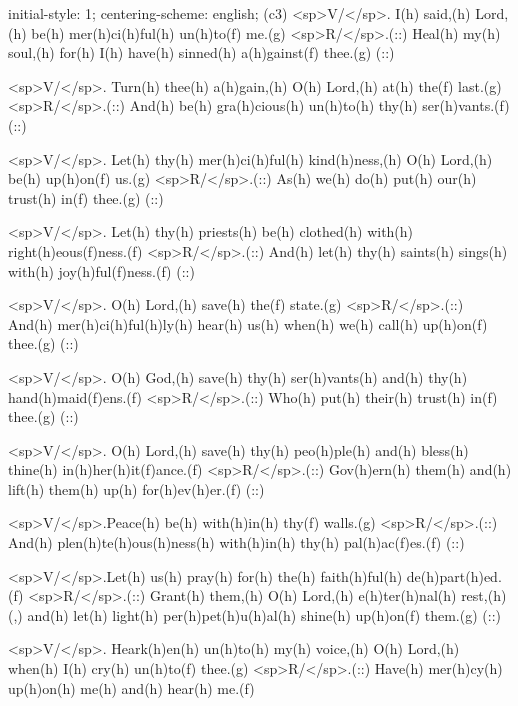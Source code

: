 initial-style: 1;
centering-scheme: english;
(c3) <sp>V/</sp>. I(h) said,(h) Lord,(h) be(h) mer(h)ci(h)ful(h) un(h)to(f) me.(g) <sp>R/</sp>.(::) Heal(h) my(h) soul,(h) for(h) I(h) have(h) sinned(h) a(h)gainst(f) thee.(g) (::)

<sp>V/</sp>. Turn(h) thee(h) a(h)gain,(h) O(h) Lord,(h) at(h) the(f) last.(g) <sp>R/</sp>.(::) And(h) be(h) gra(h)cious(h) un(h)to(h) thy(h) ser(h)vants.(f) (::)

<sp>V/</sp>. Let(h) thy(h) mer(h)ci(h)ful(h) kind(h)ness,(h) O(h) Lord,(h) be(h) up(h)on(f) us.(g) <sp>R/</sp>.(::) As(h) we(h) do(h) put(h) our(h) trust(h) in(f) thee.(g) (::)

<sp>V/</sp>. Let(h) thy(h) priests(h) be(h) clothed(h) with(h) right(h)eous(f)ness.(f) <sp>R/</sp>.(::) And(h) let(h) thy(h) saints(h) sings(h) with(h) joy(h)ful(f)ness.(f) (::)

<sp>V/</sp>. O(h) Lord,(h) save(h) the(f) state.(g) <sp>R/</sp>.(::) And(h) mer(h)ci(h)ful(h)ly(h) hear(h) us(h) when(h) we(h) call(h) up(h)on(f) thee.(g) (::)

<sp>V/</sp>. O(h) God,(h) save(h) thy(h) ser(h)vants(h) and(h) thy(h) hand(h)maid(f)ens.(f) <sp>R/</sp>.(::) Who(h) put(h) their(h) trust(h) in(f) thee.(g) (::)

<sp>V/</sp>. O(h) Lord,(h) save(h) thy(h) peo(h)ple(h) and(h) bless(h) thine(h) in(h)her(h)it(f)ance.(f) <sp>R/</sp>.(::) Gov(h)ern(h) them(h) and(h) lift(h) them(h) up(h) for(h)ev(h)er.(f) (::)

<sp>V/</sp>.Peace(h) be(h) with(h)in(h) thy(f) walls.(g) <sp>R/</sp>.(::) And(h) plen(h)te(h)ous(h)ness(h) with(h)in(h) thy(h) pal(h)ac(f)es.(f) (::)

<sp>V/</sp>.Let(h) us(h) pray(h) for(h) the(h) faith(h)ful(h) de(h)part(h)ed.(f) <sp>R/</sp>.(::) Grant(h) them,(h) O(h) Lord,(h) e(h)ter(h)nal(h) rest,(h) (,) and(h) let(h) light(h) per(h)pet(h)u(h)al(h) shine(h) up(h)on(f) them.(g) (::)

<sp>V/</sp>. Heark(h)en(h) un(h)to(h) my(h) voice,(h) O(h) Lord,(h) when(h) I(h) cry(h) un(h)to(f) thee.(g) <sp>R/</sp>.(::) Have(h) mer(h)cy(h) up(h)on(h) me(h) and(h) hear(h) me.(f)
